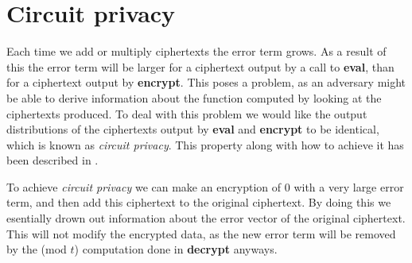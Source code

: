 \documentclass[../main.tex]{subfiles}
\begin{document}
\section{Circuit privacy}
Each time we add or multiply ciphertexts the error term grows.
As a result of this the error term will be larger for a ciphertext output by a call to \textbf{eval}, than for a ciphertext output by \textbf{encrypt}.
This poses a problem, as an adversary might be able to derive information about the function computed by looking at the ciphertexts produced.
To deal with this problem we would like the output distributions of the ciphertexts output by \textbf{eval} and \textbf{encrypt} to be identical, which is known as \textit{circuit privacy}.
This property along with how to achieve it has been described in \cite{gentry2009fully}.

To achieve \textit{circuit privacy} we can make an encryption of $0$ with a very large error term, and then add this ciphertext to the original ciphertext.
By doing this we esentially drown out information about the error vector of the original ciphertext.
This will not modify the encrypted data, as the new error term will be removed by the (mod $t$) computation done in \textbf{decrypt} anyways.
\end{document}

